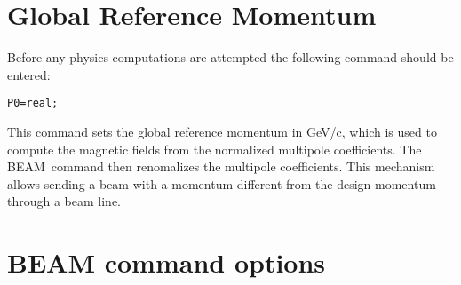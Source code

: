 \section{Global Reference Momentum}
\label{sec:P0}
Before any physics computations are attempted the following command
should be entered:
\begin{verbatim}
P0=real;
\end{verbatim}
This command sets the global reference momentum in GeV/c,
which is used to compute the magnetic fields from the normalized
multipole coefficients.
The {BEAM}~command  then renomalizes the
multipole coefficients.
This mechanism allows sending a beam with a momentum different from the
design momentum through a beam line.

\section{BEAM command options}

